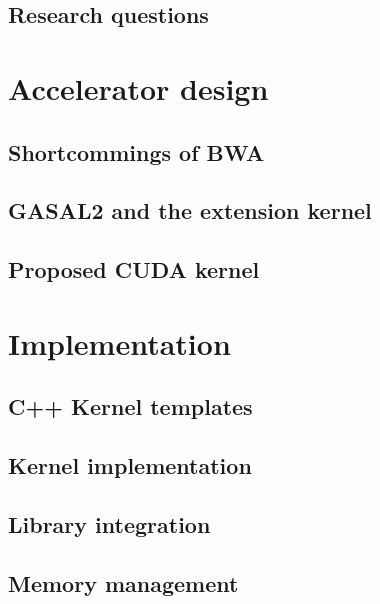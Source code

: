 \documentclass[11pt,a4paper]{report}
\begin{document}
		\section{Research questions}
		
		
	\chapter{Accelerator design}
	\label{chap:accel}
		
		
		\section{Shortcommings of BWA}
		
		\section{GASAL2 and the extension kernel}
			
		
		\section{Proposed CUDA kernel}
		
	
	\chapter{Implementation}
	\label{chap:implementation}
	
		
		\section{C++ Kernel templates}
		
	
		\section{Kernel implementation}
		
		
		\section{Library integration}
		
		
		\section{Memory management}
		
	
\end{document}
